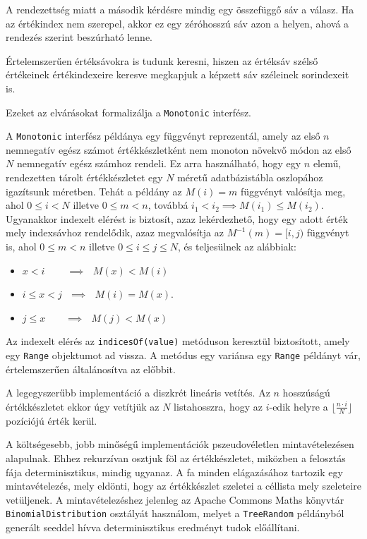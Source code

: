 \documentclass[
    parspace,
    noindent,
    nohyp,
]{elteiktdk}[2023/04/10]
\newcommand{\todoref}[1]{\todo[inline, noinlinepar, color=red, textcolor=white, inlinewidth=0.6cm, caption={#1}]{\large \textbf{×}}}
\begin{document}
A rendezettség miatt a második kérdésre mindig egy összefüggő sáv a válasz. Ha az értékindex nem szerepel, akkor ez egy zéróhosszú sáv azon a helyen, ahová a rendezés szerint beszúrható lenne.

Értelemszerűen értéksávokra is tudunk keresni, hiszen az értéksáv szélső értékeinek értékindexeire keresve megkapjuk a képzett sáv széleinek sorindexeit is.

Ezeket az elvárásokat formalizálja a \texttt{Monotonic} interfész.

A \texttt{Monotonic} interfész példánya egy függvényt reprezentál,
amely az első $n$ nemnegatív egész számot értékkészletként nem monoton növekvő módon
az első $N$ nemnegatív egész számhoz rendeli.
Ez arra használható, hogy egy $n$ elemű, rendezetten tárolt értékkészletet
egy $N$ méretű adatbázistábla oszlopához igazítsunk méretben.
Tehát a példány az $M(i) = m$ függvényt valósítja meg,
ahol $0 \leq i < N$ illetve $0 \leq m < n$, továbbá $i_1 < i_2 \implies M(i_1) \leq M(i_2)$.
Ugyanakkor indexelt elérést is biztosít, azaz lekérdezhető,
hogy egy adott érték mely indexsávhoz rendelődik,
azaz megvalósítja az $M^{-1}(m) = [i, j)$ függvényt is,
ahol $0 \leq m < n$ illetve $0 \leq i \leq j \leq N$, és teljesülnek az alábbiak:

\begin{itemize}
\item $x < i ~~~~~~~~~~ \implies ~~~ M(x) < M(i)$
\item $i \leq x < j ~~~ \implies ~~~ M(i) = M(x)$.
\item $j \leq x ~~~~~~~~~ \implies ~~~ M(j) < M(x)$
\end{itemize}

Az indexelt elérés az \texttt{indicesOf(value)} metóduson keresztül biztosított, amely egy \texttt{Range} objektumot ad vissza.
A metódus egy variánsa egy \texttt{Range} példányt vár, értelemszerűen általánosítva az előbbit.

A legegyszerűbb implementáció a diszkrét lineáris vetítés.
Az $n$ hosszúságú értékkészletet ekkor úgy vetítjük az $N$ listahosszra,
hogy az $i$-edik helyre a $\lfloor \frac{n \cdot i}{N} \rfloor$ pozíciójú érték kerül.

A költségesebb, jobb minőségű implementációk pszeudovéletlen mintavételezésen alapulnak.
Ehhez rekurzívan osztjuk föl az értékkészletet, miközben a felosztás fája determinisztikus, mindig ugyanaz.
A fa minden elágazásához tartozik egy mintavételezés, mely eldönti,
hogy az értékkészlet szeletei a céllista mely szeleteire vetüljenek.
A mintavételezéshez jelenleg az Apache Commons Maths könyvtár
\texttt{BinomialDistribution} osztályát használom,
melyet a \texttt{TreeRandom} példányból generált seeddel hívva
determinisztikus eredményt tudok előállítani.
\todoref{+CITE: Apache Commons Maths / BinomialDistribution}
\end{document}
